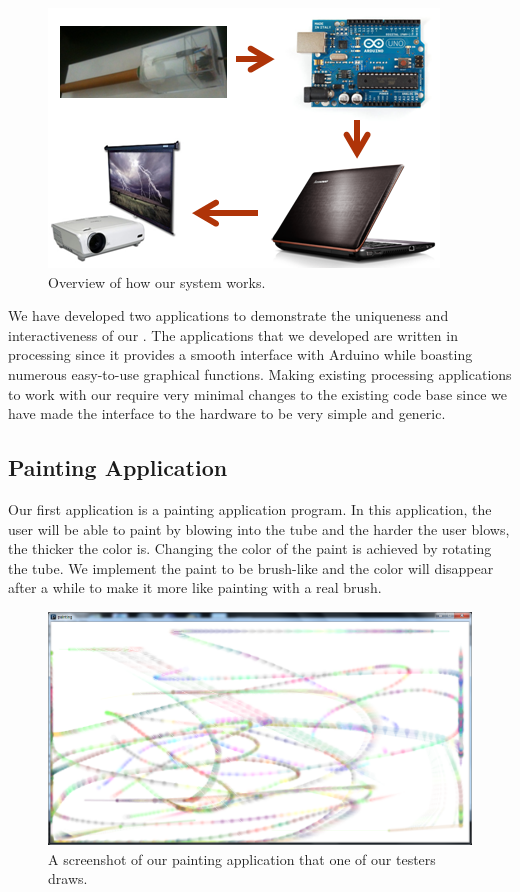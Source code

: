 \begin{figure}
  \centering
  \includegraphics[width=0.8\linewidth]{./figs/sketch.png}
  \caption{Overview of how our system works.}
  \label{fig:design-sketch}
\end{figure}

We have developed two applications to demonstrate the uniqueness and interactiveness of our \tube. The applications that we developed are written in processing since it provides a smooth interface with Arduino while boasting numerous easy-to-use graphical functions. Making existing processing applications to work with our \tube require very minimal changes to the existing code base since we have made the interface to the hardware to be very simple and generic.

\subsection{\textbf{Painting Application}}

Our first application is a painting application program. In this application, the user will be able to paint by blowing into the tube and the harder the user blows, the thicker the color is. Changing the color of the paint is achieved by rotating the tube. We implement the paint to be brush-like and the color will disappear after a while to make it more like painting with a real brush.

\begin{figure}
  \centering
  \includegraphics[width=\linewidth]{./figs/tube3.png}
  \caption{A screenshot of our painting application that one of our testers draws.}
  \label{fig:painting}
\end{figure}


